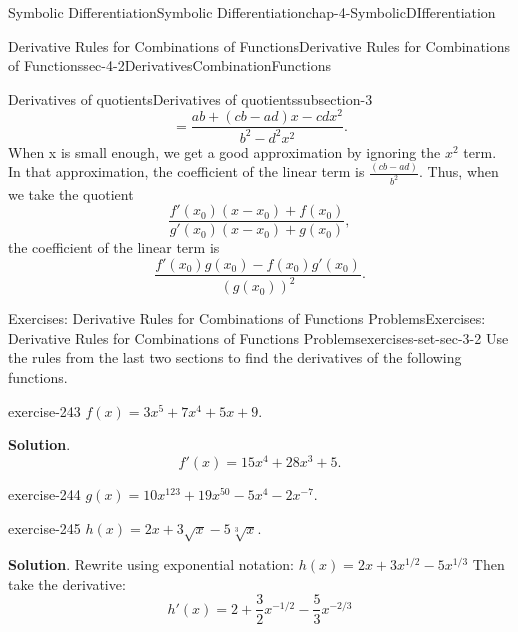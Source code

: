 \documentclass[oneside,10pt,]{book}
\numberwithin{equation}{section}
\begin{document}
\begin{chapterptx}{Symbolic Differentiation}{}{Symbolic Differentiation}{}{}{chap-4-SymbolicDIfferentiation}
\begin{sectionptx}{Derivative Rules for Combinations of Functions}{}{Derivative Rules for Combinations of Functions}{}{}{sec-4-2DerivativesCombinationFunctions}
\begin{subsectionptx}{Derivatives of quotients}{}{Derivatives of quotients}{}{}{subsection-3}
\begin{equation*}
=\frac{a b+(c b-a d)x-c d x^2}{b^2  -d^2 x^2}.
\end{equation*}
\hypertarget{p-1565}{}%
When x is small enough, we get a good approximation by ignoring the \(x^2\) term.  In that approximation, the coefficient of the linear term is \(\frac{(c b-a d)}{b^2}\).  Thus, when we take the quotient%
%
\begin{equation*}
\frac{f' (x_0 )(x-x_0 )+f(x_0 )}{g' (x_0 )(x-x_0 )+g(x_0 )},
\end{equation*}
\hypertarget{p-1566}{}%
the coefficient of the linear term is%
%
\begin{equation*}
\frac{f'(x_0 )g(x_0 )-f(x_0)g'(x_0 )}{(g(x_0 ))^2}.
\end{equation*}
\end{subsectionptx}
%
%
\typeout{************************************************}
\typeout{************************************************}
%
\begin{exercises-subsection}{Exercises: Derivative Rules for Combinations of Functions Problems}{}{Exercises: Derivative Rules for Combinations of Functions Problems}{}{}{exercises-set-sec-3-2}
\hypertarget{p-1567}{}%
Use the rules from the last two sections to find the derivatives of the following functions.%
\begin{divisionexercise}{1}{}{}{exercise-243}%
\hypertarget{p-1568}{}%
\(f(x)=3x^5+7x^4+5x+9\).%
\par\smallskip%
\noindent\textbf{Solution}.\hypertarget{solution-121}{}\quad%
%
\begin{equation*}
f'(x)=15x^4+28x^3+5.
\end{equation*}
\end{divisionexercise}%
\begin{divisionexercise}{2}{}{}{exercise-244}%
\hypertarget{p-1569}{}%
\(g(x)=10x^{123}+19x^{50}-5x^4-2x^{-7}\).%
\end{divisionexercise}%
\begin{divisionexercise}{3}{}{}{exercise-245}%
\hypertarget{p-1570}{}%
\(h(x)=2x+3\sqrt{x}-5\sqrt[3]{x}\).%
\par\smallskip%
\noindent\textbf{Solution}.\hypertarget{solution-122}{}\quad%
\hypertarget{p-1571}{}%
Rewrite using exponential notation: \(h(x)=2x+3x^{1/2}-5x^{1/3}\) Then take the derivative:%
%
\begin{equation*}
h'(x)=2+\frac{3}{2} x^{-1/2}-\frac{5}{3} x^{-2/3}
\end{equation*}
\end{divisionexercise}%

\end{exercises-subsection}
\end{sectionptx}
\end{chapterptx}
\end{document}
